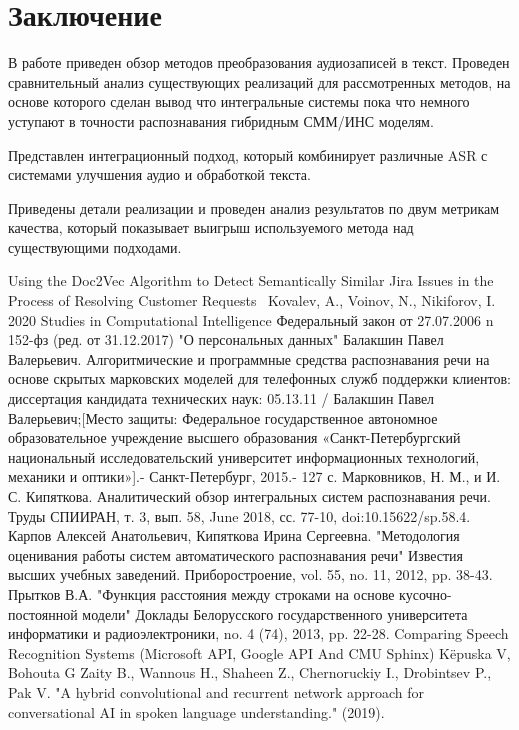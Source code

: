 \documentclass[conference]{IEEEtran}
\begin{document}
\section{Заключение}
В работе приведен обзор методов преобразования аудиозаписей в текст. Проведен сравнительный анализ существующих реализаций для рассмотренных методов, на основе которого сделан вывод что интегральные системы пока что немного уступают в точности распознавания гибридным СММ/ИНС моделям.

Представлен интеграционный подход, который комбинирует различные ASR с системами улучшения аудио и обработкой текста.

Приведены детали реализации и проведен анализ результатов по двум метрикам качества, который показывает выигрыш используемого метода над существующими подходами.


\begin{thebibliography}{00}
 Using the Doc2Vec Algorithm to Detect Semantically Similar Jira Issues in the Process of Resolving Customer Requests  Kovalev, A., Voinov, N., Nikiforov, I. 2020 Studies in Computational Intelligence
 Федеральный закон от 27.07.2006 n 152-фз (ред. от 31.12.2017) "О персональных данных"
 Балакшин Павел Валерьевич. Алгоритмические и программные средства распознавания речи на основе скрытых марковских моделей для телефонных служб поддержки клиентов: диссертация кандидата технических наук: 05.13.11 / Балакшин Павел Валерьевич;[Место защиты: Федеральное государственное автономное образовательное учреждение высшего образования «Санкт-Петербургский национальный исследовательский университет информационных технологий, механики и оптики»].- Санкт-Петербург, 2015.- 127 с.
 Марковников, Н. М., и И. С. Кипяткова. Аналитический обзор интегральных систем распознавания речи. Труды СПИИРАН, т. 3, вып. 58, June 2018, сс. 77-10, doi:10.15622/sp.58.4.
 Карпов Алексей Анатольевич, Кипяткова Ирина Сергеевна. "Методология оценивания работы систем автоматического распознавания речи" Известия высших учебных заведений. Приборостроение, vol. 55, no. 11, 2012, pp. 38-43.
 Прытков В.А. "Функция расстояния между строками на основе кусочно-постоянной модели" Доклады Белорусского государственного университета информатики и радиоэлектроники, no. 4 (74), 2013, pp. 22-28.
 Comparing Speech Recognition Systems (Microsoft API, Google API And CMU Sphinx) Këpuska V, Bohouta G
 Zaity B., Wannous H., Shaheen Z., Chernoruckiy I., Drobintsev P., Pak V. "A hybrid convolutional and recurrent network approach for conversational AI in spoken language understanding." (2019).
\end{thebibliography}
\vspace{12pt}
\end{document}
